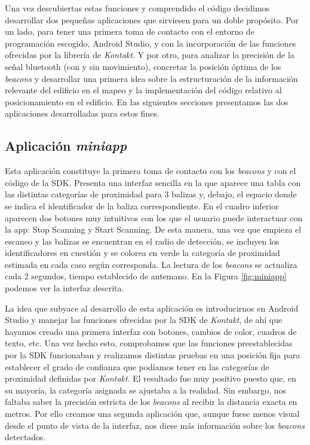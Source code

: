 Una vez descubiertas estas funciones y comprendido el código decidimos desarrollar dos pequeñas aplicaciones que sirviesen para un doble propósito. Por un lado, para tener una primera toma de contacto con el entorno de programación escogido, Android Studio, y con la incorporación de las funciones ofrecidas por la librería de \textit{Kontakt}. Y por otro, para analizar la precisión de la señal bluetooth (con y sin movimiento), concretar la posición óptima de los \textit{beacons} y desarrollar una primera idea sobre la estructuración de la información relevante del edificio en el mapeo y la implementación del código relativo al posicionamiento en el edificio. En las siguientes secciones presentamos las dos aplicaciones desarrolladas para estos fines.


\subsection{Aplicación \textit{miniapp}}
Esta aplicación constituye la primera toma de contacto con los \textit{beacons} y con el código de la SDK. Presenta una interfaz sencilla en la que aparece una tabla con las distintas categorías de proximidad para 3 balizas y, debajo, el espacio donde se indica el identificador de la baliza correspondiente. En el cuadro inferior aparecen dos botones muy intuitivos con los que el usuario puede interactuar con la app: Stop Scanning y Start Scanning. De esta manera, una vez que empieza el escaneo y las balizas se encuentran en el radio de detección, se incluyen los identificadores en cuestión y se colorea en verde la categoría de proximidad estimada en cada caso según corresponda. La lectura de los \textit{beacons} se actualiza cada 2 segundos, tiempo establecido de antemano. En la Figura \ref{fig:miniapp} podemos ver la interfaz descrita.

La idea que subyace al desarrollo de esta aplicación es introducirnos en Android Studio y manejar las funciones ofrecidas por la SDK de \textit{Kontakt}, de ahí que hayamos creado una primera interfaz con botones, cambios de color, cuadros de texto, etc. Una vez hecho esto, comprobamos que las funciones preestablecidas por la SDK funcionaban y realizamos distintas pruebas en una posición fija para establecer el grado de confianza que podíamos tener en las categorías de proximidad definidas por \textit{Kontakt}. El resultado fue muy positivo puesto que, en su mayoría, la categoría asignada se ajustaba a la realidad. Sin embargo, nos faltaba saber la precisión estricta de los \textit{beacons} al recibir la distancia exacta en metros. Por ello creamos una segunda aplicación que, aunque fuese menos visual desde el punto de vista de la interfaz, nos diese más información sobre los \textit{beacons} detectados.

